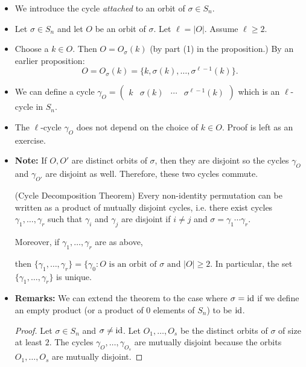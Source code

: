 \begin{itemize}
\begin{proof}
\begin{enumerate}
            Note that we also have to prove the reverse direction. We know that $j\in O_{\sigma}(k)$ since $j\in O_{\sigma}(j)$.
            \item We will prove the contrapositive. Suppose $O_{\sigma}(j) \cap O_\sigma(k) \neq \emptyset$. Then, there exist $m_1,m_2 \in \mathbb{Z}$ such that:
            \begin{equation}
                \sigma^{m_1}(j) = \sigma^{m_2}(k).
            \end{equation}
            Therefore, $j=\sigma^{m_2-m_1}(k) \in O_{\sigma}(k)$. By part (1), we have $O_\sigma(j)=O_\sigma(k)$.
        \end{enumerate}
    \end{proof}
    \item We introduce the cycle \textit{attached} to an orbit of $\sigma \in S_n$.
    \item Let $\sigma \in S_n$ and let $O$ be an orbit of $\sigma$. Let $\ell = |O|$. Assume $\ell \ge 2$.
    \item Choose a $k \in O$. Then $O=O_{\sigma}(k)$ (by part (1) in the proposition.) By an earlier proposition:
    \begin{equation}
        O = O_{\sigma}(k) = \{k,\sigma(k),\dots,\sigma^{\ell-1}(k) \}.
    \end{equation}
    \item We can define a cycle $\gamma_O = \begin{pmatrix}
        k & \sigma(k) & \cdots & \sigma^{\ell-1}(k)
    \end{pmatrix}$ which is an $\ell$-cycle in $S_n$.
    \item The $\ell$-cycle $\gamma_O$ does not depend on the choice of $k\in O$. Proof is left as an exercise.
    \item\textbf{Note:} If $O, O'$ are distinct orbits of $\sigma$, then they are disjoint so the cycles $\gamma_O$ and $\gamma_{O'}$ are disjoint as well. Therefore, these two cycles commute.
    \begin{theorem}
        (Cycle Decomposition Theorem) Every non-identity permutation can be written as a product of mutually disjoint cycles, i.e. there exist cycles $\gamma_1,\dots,\gamma_r$ such that $\gamma_i$ and $\gamma_j$ are disjoint if $i\neq j$ and $\sigma = \gamma_1 \cdots \gamma_r$.

        Moreover, if $\gamma_1,\dots,\gamma_r$ are as above,

        then $\{\gamma_1,\dots,\gamma_r\} = \{\gamma_0:O\text{ is an orbit of } \sigma \text{ and } |O|\ge 2$. In particular, the set $\{\gamma_1,\dots,\gamma_r\}$ is unique.
    \end{theorem}
    \item \textbf{Remarks:} We can extend the theorem to the case where $\sigma = \text{id}$ if we define an empty product (or a product of $0$ elements of $S_n$) to be $\text{id}$.
    \begin{proof}
        Let $\sigma \in S_n$ and $\sigma \neq \text{id}$. Let $O_1,\dots, O_s$ be the distinct orbits of $\sigma$ of size at least $2$. The cycles $\gamma_O, \dots, \gamma_{O_s}$ are mutually disjoint because the orbits $O_1,\dots, O_s$ are mutually disjoint.


\end{proof}
\end{itemize}

